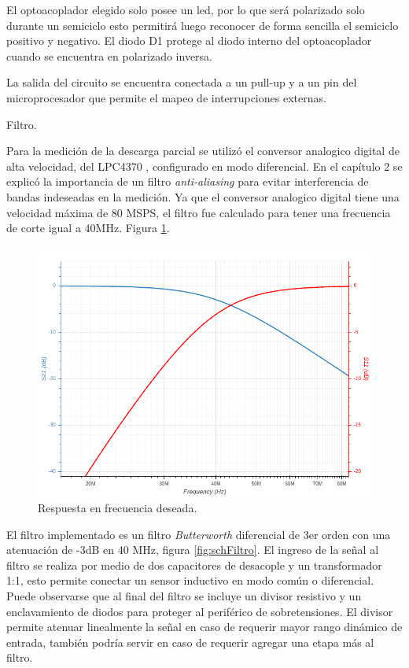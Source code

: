 El optoacoplador elegido solo posee un led, por lo que será polarizado solo durante un semiciclo esto permitirá luego reconocer de forma sencilla el semiciclo positivo y negativo. El diodo D1 protege al diodo interno del optoacoplador cuando se encuentra en polarizado inversa.

La salida del circuito se encuentra conectada a un pull-up y a un pin del microprocesador que permite el mapeo de interrupciones externas.

\vspace{10mm}
Filtro.

Para la medición de la descarga parcial se utilizó el conversor analogico digital de alta velocidad, del LPC4370 \citep{micro:lpc4370}, configurado en modo diferencial. En el capítulo 2 se explicó la importancia de un filtro \textit{anti-aliasing} para evitar interferencia de bandas indeseadas en la medición. Ya que el conversor analogico digital tiene una velocidad máxima de 80 MSPS, el filtro fue calculado para tener una frecuencia de corte igual a 40MHz. Figura \ref{fig:respFrec}. 

\vspace{5mm}

\begin{figure}[ht]
	\centering
	\includegraphics[width=130mm]{./Figures/respFrec.png}
	\caption{Respuesta en frecuencia deseada.}
	\label{fig:respFrec}
\end{figure}

\vspace{5mm}

El filtro implementado es un filtro \textit{Butterworth} diferencial de 3er orden con una atenuación de -3dB en 40 MHz, figura \ref{fig:schFiltro}. El ingreso de la señal al filtro se realiza por medio de dos capacitores de desacople y un transformador 1:1, esto permite conectar un sensor inductivo en modo común o diferencial. Puede observarse que al final del filtro se incluye un divisor resistivo y un enclavamiento de diodos para proteger al periférico de sobretensiones. El divisor permite atenuar linealmente la señal en caso de requerir mayor rango dinámico de entrada, también podría servir en caso de requerir agregar una etapa más al filtro.


